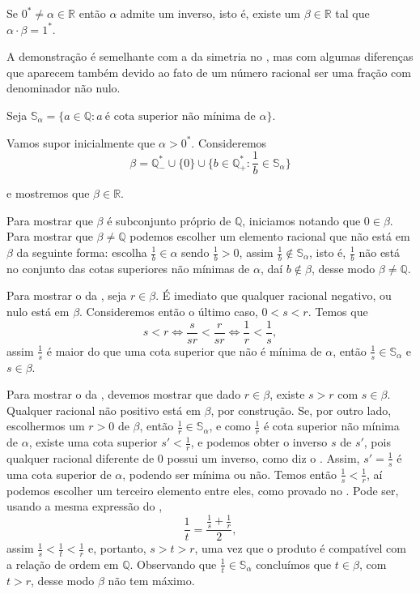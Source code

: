 \documentclass[../main.tex]{subfiles}
\begin{document}
\begin{teo}\label{reais-teo-simetricoProduto}
    Se $0^* \neq \alpha \in \mathbb{R}$ então $\alpha$ admite um inverso, isto é, existe um $\beta \in \mathbb{R}$ tal que $\alpha \cdot \beta = 1^*$.
\end{teo}
\begin{dem}
    A demonstração é semelhante com a da simetria no , mas com algumas diferenças que aparecem também devido ao fato de um número racional ser uma fração com denominador não nulo.

    Seja $\mathbb{S}_{\alpha} = \{a \in \mathbb{Q} : a\ \text{é cota superior não mínima de }\alpha \}$.

    Vamos supor inicialmente que $\alpha > 0^*$. Consideremos 
    \[ \beta = \mathbb{Q}_{-}^* \cup \{ 0 \} \cup 
    \{ b \in \mathbb{Q}_{+}^* : \frac{1}{b} \in \mathbb{S}_{\alpha} \} \] 

    \noindent e mostremos que $\beta \in \mathbb{R}$.
    
    Para mostrar que $\beta$ é subconjunto próprio de $\mathbb{Q}$, iniciamos notando que $0 \in \beta$. Para mostrar que $\beta \neq \mathbb{Q}$ podemos escolher um elemento racional que não está em $\beta$ da seguinte forma: escolha $\frac{1}{b} \in \alpha$ sendo $\frac{1}{b} > 0$, assim $\frac{1}{b} \not\in \mathbb{S}_{\alpha}$, isto é, $\frac{1}{b}$ não está no conjunto das cotas superiores não mínimas de $\alpha$, daí $b \not\in \beta$, desse modo $\beta \neq \mathbb{Q}$.
    
    Para mostrar o  da , seja $r \in \beta$. É imediato que qualquer racional negativo, ou nulo está em $\beta$. Consideremos então o último caso, $0 < s < r$. Temos que 
    \[ s < r \iff \frac{s}{sr} < \frac{r}{sr} \iff \frac{1}{r} < \frac{1}{s}, \] 
    assim $\frac{1}{s}$ é maior do que uma cota superior que não é mínima de $\alpha$, então $\frac{1}{s} \in \mathbb{S}_{\alpha}$ e $s \in \beta$.

    Para mostrar o  da , devemos mostrar que dado $r \in \beta$, existe $s>r$ com $s \in \beta$. Qualquer racional não positivo está em $\beta$, por construção. Se, por outro lado, escolhermos um $r > 0$ de $\beta$, então $\frac{1}{r} \in \mathbb{S}_{\alpha}$, e como $\frac{1}{r}$ é cota superior não mínima de $\alpha$, existe uma cota superior $s' < \frac{1}{r}$, e podemos obter o inverso $s$ de $s'$, pois qualquer racional diferente de $0$ possui um inverso, como diz o . Assim, $s' = \frac{1}{s}$ é uma cota superior de $\alpha$, podendo ser mínima ou não. Temos então $\frac{1}{s} < \frac{1}{r}$, aí podemos escolher um terceiro elemento entre eles, como provado no . Pode ser, usando a mesma expressão do ,
    \[ \dfrac{1}{t} = \dfrac{\frac{1}{s} + \frac{1}{r}}{2}, \]
    assim $\frac{1}{s} < \frac{1}{t} < \frac{1}{r}$ e, portanto, $s > t > r$, uma vez que o produto é compatível com a relação de ordem em $\mathbb{Q}$. Observando que $\frac{1}{t} \in \mathbb{S}_{\alpha}$ concluímos que $t \in \beta$, com $t>r$, desse modo $\beta$ não tem máximo. 


\end{dem}
\end{document}
